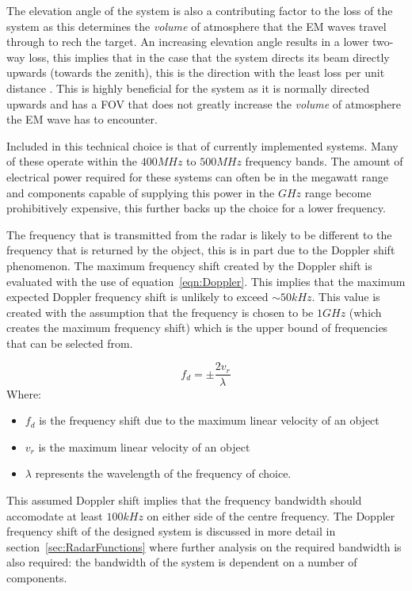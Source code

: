\documentclass[11pt]{witseiepaper}
\begin{document}
The elevation angle of the system is also a contributing factor to the loss of the system as this determines the \textit{volume} of atmosphere that the EM waves travel through to rech the target. An increasing elevation angle results in a lower two-way loss, this implies that in the case that the system directs its beam directly upwards (towards the zenith), this is the direction with the least loss per unit distance \cite[p~.70]{elevationLoss}. This is highly beneficial for the system as it is normally directed upwards and has a FOV that does not greatly increase the \textit{volume} of atmosphere the EM wave has to encounter.

Included in this technical choice is that of currently implemented systems. Many of these operate within the $400 MHz$ to $500 MHz$ frequency bands.
The amount of electrical power required for these systems can often be in the megawatt range and components capable of supplying this power in the $GHz$ range become prohibitively expensive, this further backs up the choice for a lower frequency.

The frequency that is transmitted from the radar is likely to be different to the frequency that is returned by the object, this is in part due to the Doppler shift phenomenon. The maximum frequency shift created by the Doppler shift is evaluated with the use of equation~\ref{eqn:Doppler}. This implies that the maximum expected Doppler frequency shift is unlikely to exceed $\sim 50 kHz$. This value is created with the assumption that the frequency is chosen to be $1 GHz$ (which creates the maximum frequency shift) which is the upper bound of frequencies that can be selected from.


\begin{equation} \label{eqn:Doppler}
    f_{d} = \pm \frac{2 v_{r}}{\lambda}    
\end{equation}
Where:
\begin{itemize}
    \item $f_{d}$ is the frequency shift due to the maximum linear velocity of an object
    \item $v_{r}$ is the maximum linear velocity of an object
    \item $\lambda$ represents the wavelength of the frequency of choice.
\end{itemize}

This assumed Doppler shift implies that the frequency bandwidth should accomodate at least $100 kHz$ on either side of the centre frequency.
The Doppler frequency shift of the designed system is discussed in more detail in section~\ref{sec:RadarFunctions} where further analysis on the required bandwidth is also required: the bandwidth of the system is dependent on a number of components.
\end{document}

